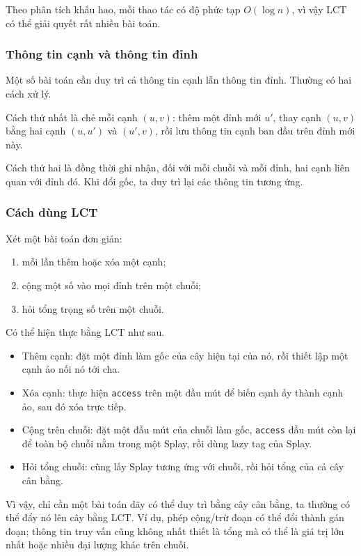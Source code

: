 \documentclass[11pt]{article}
\begin{document}
Theo phân tích khấu hao, mỗi thao tác có độ phức tạp \(O(\log n)\), vì vậy LCT
có thể giải quyết rất nhiều bài toán.

\subsubsection{Thông tin cạnh và thông tin đỉnh}

Một số bài toán cần duy trì cả thông tin cạnh lẫn thông tin đỉnh. Thường có hai
cách xử lý.

Cách thứ nhất là chẻ mỗi cạnh \((u,v)\): thêm một đỉnh mới \(u'\), thay cạnh
\((u,v)\) bằng hai cạnh \((u,u')\) và \((u',v)\), rồi lưu thông tin cạnh ban đầu
trên đỉnh mới này.

Cách thứ hai là đồng thời ghi nhận, đối với mỗi chuỗi và mỗi đỉnh, hai cạnh liên
quan với đỉnh đó. Khi đổi gốc, ta duy trì lại các thông tin tương ứng.

\subsubsection{Cách dùng LCT}

Xét một bài toán đơn giản:
\begin{enumerate}
  \item mỗi lần thêm hoặc xóa một cạnh;
  \item cộng một số vào mọi đỉnh trên một chuỗi;
  \item hỏi tổng trọng số trên một chuỗi.
\end{enumerate}

Có thể hiện thực bằng LCT như sau.

\begin{itemize}
  \item Thêm cạnh: đặt một đỉnh làm gốc của cây hiện tại của nó, rồi thiết lập
  một cạnh ảo nối nó tới cha.
  \item Xóa cạnh: thực hiện \texttt{access} trên một đầu mút để biến cạnh ấy
  thành cạnh ảo, sau đó xóa trực tiếp.
  \item Cộng trên chuỗi: đặt một đầu mút của chuỗi làm gốc, \texttt{access} đầu
  mút còn lại để toàn bộ chuỗi nằm trong một Splay, rồi dùng lazy tag của Splay.
  \item Hỏi tổng chuỗi: cũng lấy Splay tương ứng với chuỗi, rồi hỏi tổng của cả
  cây cân bằng.
\end{itemize}

Vì vậy, chỉ cần một bài toán dãy có thể duy trì bằng cây cân bằng, ta thường có
thể đẩy nó lên cây bằng LCT. Ví dụ, phép cộng/trừ đoạn có thể đổi thành gán
đoạn; thông tin truy vấn cũng không nhất thiết là tổng mà có thể là giá trị lớn
nhất hoặc nhiều đại lượng khác trên chuỗi.
\end{document}
